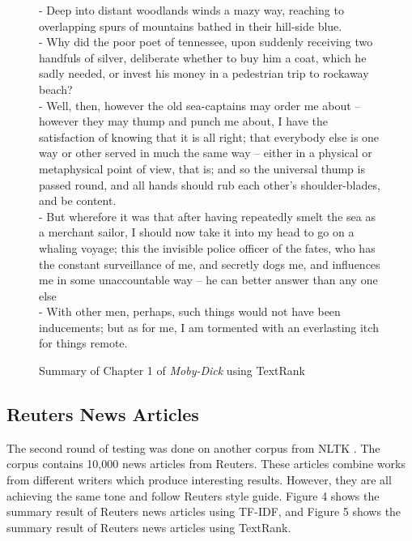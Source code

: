 \documentclass{article}[10]
\begin{document}
\begin{figure}
    \begin{framed}
        - Deep into distant woodlands winds a mazy way, reaching to overlapping spurs of mountains bathed in their hill-side blue.\\
        - Why did the poor poet of tennessee, upon suddenly receiving two handfuls of silver, deliberate whether to buy him a coat, which he sadly needed, or invest his money in a pedestrian trip to rockaway beach?\\
        - Well, then, however the old sea-captains may order me about -- however they may thump and punch me about, I have the satisfaction of knowing that it is all right; that everybody else is one way or other served in much the same way -- either in a physical or metaphysical point of view, that is; and so the universal thump is passed round, and all hands should rub each other's shoulder-blades, and be content.\\
        - But wherefore it was that after having repeatedly smelt the sea as a merchant sailor, I should now take it into my head to go on a whaling voyage; this the invisible police officer of the fates, who has the constant surveillance of me, and secretly dogs me, and influences me in some unaccountable way -- he can better answer than any one else \\
        - With other men, perhaps, such things would not have been inducements; but as for me, I am tormented with an everlasting itch for things remote.\\
        \caption{Summary of Chapter 1 of \textit{Moby-Dick} using TextRank}
        \label{results-textrank-moby}
    \end{framed}
\end{figure}

\subsection{Reuters News Articles}
The second round of testing was done on another corpus from NLTK \cite{bird2009natural}. The corpus contains 10,000 news articles from Reuters. These articles combine works from different writers which produce interesting results. However, they are all achieving the same tone and follow Reuters style guide. Figure 4 shows the summary result of Reuters news articles using TF-IDF, and Figure 5 shows the summary result of Reuters news articles using TextRank.
\end{document}

